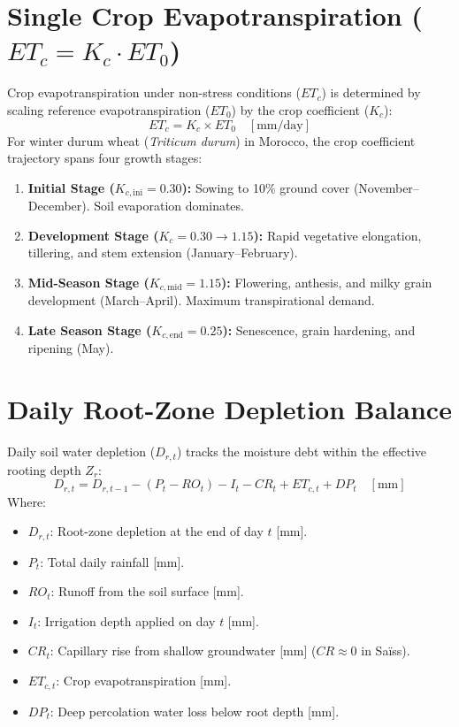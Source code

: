 \documentclass[11pt,a4paper,oneside]{report}
\begin{document}
\section{Single Crop Evapotranspiration ($ET_c = K_c \cdot ET_0$)}
Crop evapotranspiration under non-stress conditions ($ET_c$) is determined by scaling reference evapotranspiration ($ET_0$) by the crop coefficient ($K_c$):
\begin{equation}
ET_c = K_c \times ET_0 \quad [\text{mm/day}]
\end{equation}
For winter durum wheat (\textit{Triticum durum}) in Morocco, the crop coefficient trajectory spans four growth stages:
\begin{enumerate}
    \item \textbf{Initial Stage ($K_{c,\text{ini}} = 0.30$):} Sowing to 10\% ground cover (November–December). Soil evaporation dominates.
    \item \textbf{Development Stage ($K_{c} = 0.30 \rightarrow 1.15$):} Rapid vegetative elongation, tillering, and stem extension (January–February).
    \item \textbf{Mid-Season Stage ($K_{c,\text{mid}} = 1.15$):} Flowering, anthesis, and milky grain development (March–April). Maximum transpirational demand.
    \item \textbf{Late Season Stage ($K_{c,\text{end}} = 0.25$):} Senescence, grain hardening, and ripening (May).
\end{enumerate}

\section{Daily Root-Zone Depletion Balance}
Daily soil water depletion ($D_{r,t}$) tracks the moisture debt within the effective rooting depth $Z_r$:
\begin{equation}
D_{r,t} = D_{r,t-1} - (P_t - RO_t) - I_t - CR_t + ET_{c,t} + DP_t \quad [\text{mm}]
\label{eq:depletion}
\end{equation}
Where:
\begin{itemize}[leftmargin=*]
    \item $D_{r,t}$: Root-zone depletion at the end of day $t$ [$\text{mm}$].
    \item $P_t$: Total daily rainfall [$\text{mm}$].
    \item $RO_t$: Runoff from the soil surface [$\text{mm}$].
    \item $I_t$: Irrigation depth applied on day $t$ [$\text{mm}$].
    \item $CR_t$: Capillary rise from shallow groundwater [$\text{mm}$] ($CR \approx 0$ in Saïss).
    \item $ET_{c,t}$: Crop evapotranspiration [$\text{mm}$].
    \item $DP_t$: Deep percolation water loss below root depth [$\text{mm}$].
\end{itemize}
\end{document}
